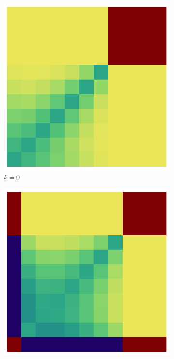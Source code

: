 \documentclass{article}
\theoremstyle{definition}
\begin{document}
\begin{figure}[H]
    \centering
    \begin{subfigure}[b]{0.185\textwidth}
        \includegraphics[width=\textwidth]{img/ppkB_Plot_4_0_10.pdf}
        \caption{$k=0$}
        \label{fig:ppkBG_4_0}
    \end{subfigure}
    \hspace{0.00\textwidth} %
    \begin{subfigure}[b]{0.185\textwidth}
        \includegraphics[width=\textwidth]{img/ppkB_Plot_4_1_10.pdf}

\end{subfigure}
\end{figure}
\end{document}

